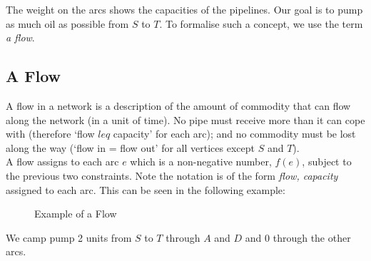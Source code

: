 The weight on the arcs shows the capacities of the pipelines. Our goal is to pump as much oil as possible from $S$ to $T$. To formalise such a concept, we use the term \textit{a flow}. 

\subsection{A Flow}
A flow in a network is a description of the amount of commodity that can flow along the network (in a unit of time). No pipe must receive more than it can cope with (therefore `flow $leq$ capacity' for each arc); and no commodity must be lost along the way (`flow in = flow out' for all vertices except $S$ and $T$).\\

A flow assigns to each arc $e$ which is a non-negative number, $f(e)$, subject to the previous two constraints. Note the notation is of the form \textit{flow, capacity} assigned to each arc.  This can be seen in the following example:

\begin{minipage}{0.5\textwidth}
    \begin{figure}[H]
        \centering
        \caption{Example of a Flow}
    \end{figure}
\end{minipage} \hfill
\begin{minipage}{0.45\textwidth}
We camp pump 2 units from $S$ to $T$ through $A$ and $D$ and 0 through the other arcs.
\end{minipage}\vspace{0.5em}

